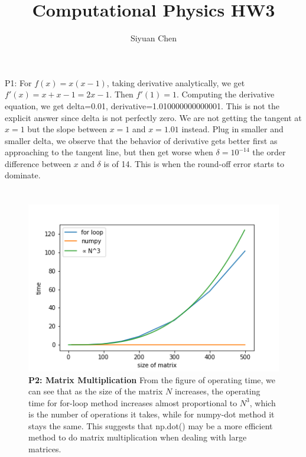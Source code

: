 \documentclass[11pt]{article}
\title{Computational Physics HW3}
\author{Siyuan Chen}
\begin{document}
\maketitle

\section*{}
P1: For $f(x)=x(x-1)$, taking derivative analytically, we get $f\prime(x)=x+x-1=2x-1$. Then $f\prime(1)=1$. Computing the derivative equation, we get delta=0.01, derivative=1.010000000000001. This is not the explicit answer since delta is not perfectly zero. We are not getting the tangent at $x=1$ but the slope between $x=1$ and $x=1.01$ instead. Plug in smaller and smaller delta, we observe that the behavior of derivative gets better first as approaching to the tangent line, but then get worse when $\delta=10^{-14}$ the order difference between $x$ and $\delta$ is of 14. This is when the round-off error starts to dominate.


\section*{}

\begin{figure}
    \includegraphics{p2.png}
    \caption{\textbf{P2: Matrix Multiplication} From the figure of operating time, we can see that as the size of the matrix $N$ increases, the operating time for for-loop method increases almost proportional to $N^3$, which is the number of operations it takes, while for numpy-dot method it stays the same. This suggests that np.dot() may be a more efficient method to do matrix multiplication when dealing with large matrices.
    }
    \label{fig}
\end{figure}
\end{document}
